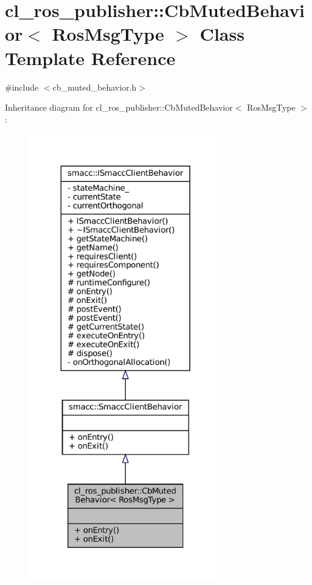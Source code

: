 \hypertarget{classcl__ros__publisher_1_1CbMutedBehavior}{}\section{cl\+\_\+ros\+\_\+publisher\+:\+:Cb\+Muted\+Behavior$<$ Ros\+Msg\+Type $>$ Class Template Reference}
\label{classcl__ros__publisher_1_1CbMutedBehavior}


{\ttfamily \#include $<$cb\+\_\+muted\+\_\+behavior.\+h$>$}



Inheritance diagram for cl\+\_\+ros\+\_\+publisher\+:\+:Cb\+Muted\+Behavior$<$ Ros\+Msg\+Type $>$\+:
\nopagebreak
\begin{figure}[H]
\begin{center}
\leavevmode
\includegraphics[height=550pt]{classcl__ros__publisher_1_1CbMutedBehavior__inherit__graph}
\end{center}
\end{figure}


